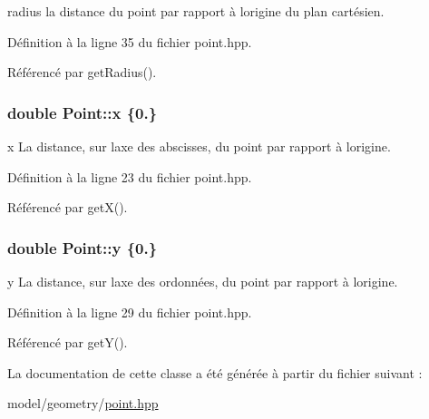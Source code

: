 radius la distance du point par rapport à l\textquotesingle{}origine du plan cartésien. 



Définition à la ligne 35 du fichier point.\+hpp.



Référencé par get\+Radius().

\hypertarget{classPoint_ab99c56589bc8ad5fa5071387110a5bc7}{}
\subsubsection[{x}]{\setlength{\rightskip}{0pt plus 5cm}double Point\+::x \{0.\}\hspace{0.3cm}{\ttfamily [private]}}\label{classPoint_ab99c56589bc8ad5fa5071387110a5bc7}


x La distance, sur l\textquotesingle{}axe des abscisses, du point par rapport à l\textquotesingle{}origine. 



Définition à la ligne 23 du fichier point.\+hpp.



Référencé par get\+X().

\hypertarget{classPoint_afa38be143ae800e6ad69ce8ed4df62d8}{}
\subsubsection[{y}]{\setlength{\rightskip}{0pt plus 5cm}double Point\+::y \{0.\}\hspace{0.3cm}{\ttfamily [private]}}\label{classPoint_afa38be143ae800e6ad69ce8ed4df62d8}


y La distance, sur l\textquotesingle{}axe des ordonnées, du point par rapport à l\textquotesingle{}origine. 



Définition à la ligne 29 du fichier point.\+hpp.



Référencé par get\+Y().



La documentation de cette classe a été générée à partir du fichier suivant \+:\begin{DoxyCompactItemize}
\item 
model/geometry/\hyperlink{point_8hpp}{point.\+hpp}\end{DoxyCompactItemize}
